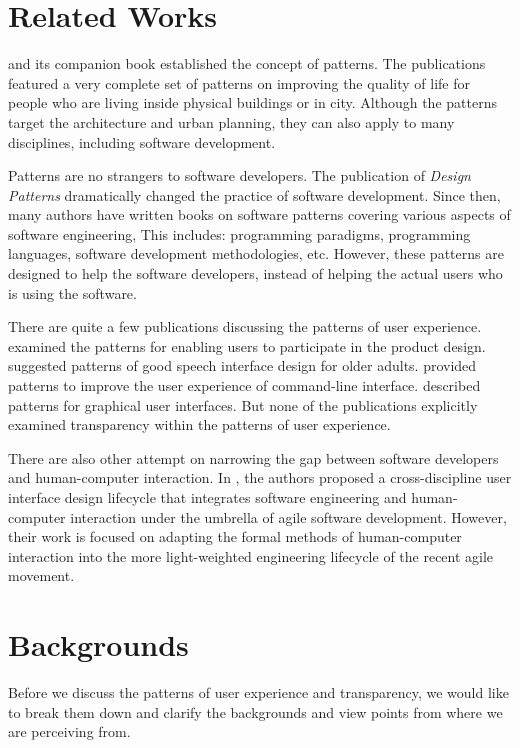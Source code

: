 \documentclass[a4paper,titlepage]{article}
\begin{document}
\section{Related Works}
\label{sec:related}
\citet{language:alexander} and its companion book
\citet{timeless:alexander} established the concept of patterns. The
publications featured a very complete set of patterns on improving the
quality of life for people who are living inside physical buildings or
in city. Although the patterns target the architecture and urban
planning, they can also apply to many disciplines, including software
development.

Patterns are no strangers to software developers. The publication of
\textit{Design Patterns} \citep{patterns:gamma} dramatically changed
the practice of software development. Since then, many authors have
written books on software patterns covering various aspects of
software engineering, This includes: programming paradigms,
programming languages, software development methodologies,
etc. However, these patterns are designed to help the software
developers, instead of helping the actual users who is using the
software.

There are quite a few publications discussing the patterns of user
experience. \citet{participatory:dearden} examined the patterns for
enabling users to participate in the product design.
\citet{speech:zajicek} suggested patterns of good speech interface
design for older adults. \citet{unix:raymond} provided patterns to
improve the user experience of command-line interface.
\citet{patterns:tidwell} described patterns for graphical user
interfaces. But none of the publications explicitly examined
transparency within the patterns of user experience.

There are also other attempt on narrowing the gap between software
developers and human-computer interaction. In \citet{agile:memmel},
the authors proposed a cross-discipline user interface design
lifecycle that integrates software engineering and human-computer
interaction under the umbrella of agile software development. However,
their work is focused on adapting the formal methods of human-computer
interaction into the more light-weighted engineering lifecycle of the
recent agile movement.


\section{Backgrounds}
\label{sec:backgrounds}
Before we discuss the patterns of user experience and transparency, we
would like to break them down and clarify the backgrounds and view
points from where we are perceiving from.
\end{document}
